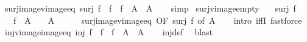 \begin{isabellebody}
\isamarkupfalse%
%
\endisatagproof
{\isafoldproof}%
%
\isadelimproof
\isanewline
%
\endisadelimproof
\isanewline
{}\isamarkupfalse%
\ surj{\isacharunderscore}{\kern0pt}image{\isacharunderscore}{\kern0pt}vimage{\isacharunderscore}{\kern0pt}eq{\isacharcolon}{\kern0pt}\ {\isachardoublequoteopen}surj\ f\ {\isasymLongrightarrow}\ f\ {\isacharbackquote}{\kern0pt}\ {\isacharparenleft}{\kern0pt}f\ {\isacharminus}{\kern0pt}{\isacharbackquote}{\kern0pt}\ A{\isacharparenright}{\kern0pt}\ {\isacharequal}{\kern0pt}\ A{\isachardoublequoteclose}\isanewline
%
\isadelimproof
\ \ %
\endisadelimproof
%
\isatagproof
{}\isamarkupfalse%
\ simp%
\endisatagproof
{\isafoldproof}%
%
\isadelimproof
\isanewline
%
\endisadelimproof
\isanewline
{}\isamarkupfalse%
\ surj{\isacharunderscore}{\kern0pt}vimage{\isacharunderscore}{\kern0pt}empty{\isacharcolon}{\kern0pt}\isanewline
\ \ \ {\isachardoublequoteopen}surj\ f{\isachardoublequoteclose}\isanewline
\ \ \ {\isachardoublequoteopen}f\ {\isacharminus}{\kern0pt}{\isacharbackquote}{\kern0pt}\ A\ {\isacharequal}{\kern0pt}\ {\isacharbraceleft}{\kern0pt}{\isacharbraceright}{\kern0pt}\ {\isasymlongleftrightarrow}\ A\ {\isacharequal}{\kern0pt}\ {\isacharbraceleft}{\kern0pt}{\isacharbraceright}{\kern0pt}{\isachardoublequoteclose}\isanewline
%
\isadelimproof
\ \ %
\endisadelimproof
%
\isatagproof
{}\isamarkupfalse%
\ surj{\isacharunderscore}{\kern0pt}image{\isacharunderscore}{\kern0pt}vimage{\isacharunderscore}{\kern0pt}eq\ {\isacharbrackleft}{\kern0pt}OF\ {\isacartoucheopen}surj\ f{\isacartoucheclose}{\isacharcomma}{\kern0pt}\ of\ A{\isacharbrackright}{\kern0pt}\isanewline
\ \ \isamarkupfalse%
\ {\isacharparenleft}{\kern0pt}intro\ iffI{\isacharparenright}{\kern0pt}\ fastforce{\isacharplus}{\kern0pt}%
\endisatagproof
{\isafoldproof}%
%
\isadelimproof
\isanewline
%
\endisadelimproof
\isanewline
{}\isamarkupfalse%
\ inj{\isacharunderscore}{\kern0pt}vimage{\isacharunderscore}{\kern0pt}image{\isacharunderscore}{\kern0pt}eq{\isacharcolon}{\kern0pt}\ {\isachardoublequoteopen}inj\ f\ {\isasymLongrightarrow}\ f\ {\isacharminus}{\kern0pt}{\isacharbackquote}{\kern0pt}\ {\isacharparenleft}{\kern0pt}f\ {\isacharbackquote}{\kern0pt}\ A{\isacharparenright}{\kern0pt}\ {\isacharequal}{\kern0pt}\ A{\isachardoublequoteclose}\isanewline
%
\isadelimproof
\ \ %
\endisadelimproof
%
\isatagproof
{}\isamarkupfalse%
\ inj{\isacharunderscore}{\kern0pt}def\ \isamarkupfalse%
\ blast%
\endisatagproof

\end{isabellebody}
